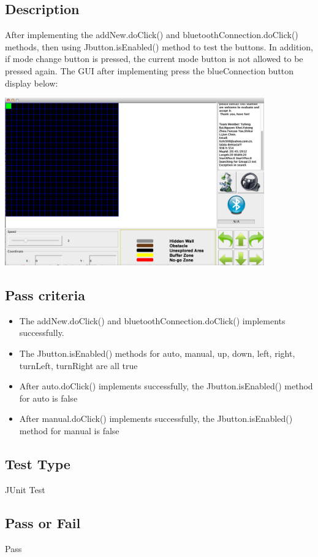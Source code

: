 \documentclass[11pt, a4paper]{report}
\begin{document}
\subsection{Description}
After implementing the addNew.doClick() and bluetoothConnection.doClick() methods, then using Jbutton.isEnabled() method to test the buttons. In addition, if mode change button is pressed, the current mode button is not allowed to be pressed again. The GUI after implementing press the blueConnection button display below:
 \begin{center}
 \includegraphics[width=11.20cm]{bluetooth}
\end{center}
\subsection{Pass criteria}
\begin{itemize}
\item The addNew.doClick() and bluetoothConnection.doClick() implements successfully.
\item The Jbutton.isEnabled() methods for auto, manual, up, down, left, right, turnLeft, turnRight are all true
\item After auto.doClick() implements successfully, the Jbutton.isEnabled() method for auto is false
\item After manual.doClick() implements successfully, the Jbutton.isEnabled() method for manual is false
\end{itemize}
\subsection{Test Type}
JUnit Test
\subsection{Pass or Fail}
Pass
\end{document}
